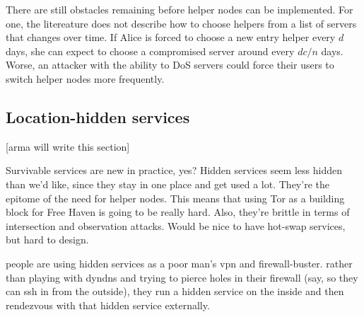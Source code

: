 \documentclass{llncs}
\begin{document}
There are still obstacles remaining before helper nodes can be implemented.
For one, the litereature does not describe how to choose helpers from a list
of servers that changes over time.  If Alice is forced to choose a new entry
helper every $d$ days, she can expect to choose a compromised server around
every $dc/n$ days.  Worse, an attacker with the ability to DoS servers could
force their users to switch helper nodes more frequently.


%


\subsection{Location-hidden services}

[arma will write this section]

Survivable services are new in practice, yes? Hidden services seem
less hidden than we'd like, since they stay in one place and get used
a lot. They're the epitome of the need for helper nodes. This means
that using Tor as a building block for Free Haven is going to be really
hard. Also, they're brittle in terms of intersection and observation
attacks. Would be nice to have hot-swap services, but hard to design.

people are using hidden services as a poor man's vpn and firewall-buster.
rather than playing with dyndns and trying to pierce holes in their
firewall (say, so they can ssh in from the outside), they run a hidden
service on the inside and then rendezvous with that hidden service
externally.
\end{document}

